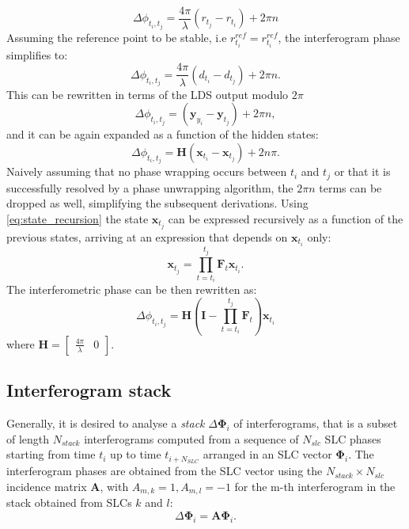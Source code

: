 \documentclass{article}
\begin{document}
\begin{equation}
	\Delta\phi_{t_i,t_j} =  \frac{4\pi}{\lambda} \left(r_{t_j} - r_{t_i}\right) + 2 \pi n
\end{equation}
Assuming the reference point to be stable, i.e $r_{t_i}^{ref} = r_{t_i}^{ref}$, the interferogram phase simplifies to:
\begin{equation}
	\Delta\phi_{t_i,t_j} =  \frac{4\pi}{\lambda} \left(d_{t_i} - d_{t_j}\right) + 2 \pi n.
\end{equation}
This can be rewritten in terms of the LDS output modulo $2\pi$ 
\begin{equation}
	\Delta\phi_{t_i,t_j} = \left(\mathbf{y}_{y_i} - \mathbf{y}_{t_j}\right) + 2 \pi n,
\end{equation}
and it can be again expanded as a function of the hidden states:
\begin{equation}\label{ifgram_phase}
	\Delta\phi_{t_i,t_j} = \mathbf{H} \left( \mathbf{x}_{t_i} - \mathbf{x}_{t_j} \right) +2 n \pi.
\end{equation}		
Naively assuming that no phase wrapping occurs between $t_{i}$ and $t_{j}$ or that it is successfully resolved by a phase unwrapping algorithm, the $2\pi n$ terms can be dropped as well, simplifying the subsequent derivations.
Using \autoref{eq:state_recursion} the state $\mathbf{x}_{t_j}$ can be expressed recursively as a function of the previous states, arriving at an expression that depends on $\mathbf{x}_{t_i}$ only:
\begin{equation}
	\mathbf{x}_{t_j} = \prod_{t=t_{i}}^{t_j}\mathbf{F}_t \mathbf{x}_{t_i}.
\end{equation}
The interferometric phase can be then rewritten as:
\begin{equation}
	\Delta\phi_{t_i,t_j} = \mathbf{H} \left(\mathbf{I} - \prod_{t=t_{i}}^{t_j}\mathbf{F}_t \right)\mathbf{x}_{t_i}
\end{equation}	
where $\mathbf{H} = 
	\begin{bmatrix}
	 \frac{4\pi}{\lambda} & 0
	\end{bmatrix}$.
\subsection{Interferogram stack}
Generally, it is desired to analyse a \emph{stack} $\Delta\mathbf{\Phi}_{i}$  of interferograms, that is a subset of length $N_{stack}$ interferograms computed from a sequence of $N_{slc}$ SLC phases starting from time $t_i$ up to time $t_{i+N_{SLC}}$ arranged in an SLC vector $\mathbf{\Phi}_i$. The interferogram phases  are obtained from the SLC vector using the  $N_{stack}\times N_{slc}$ incidence matrix $\mathbf{A}$, with $A_{m,k} = 1, A_{m,l}=-1$ for the m-th interferogram in the stack obtained from SLCs $k$ and $l$\cite{Agram2015}:
\begin{equation}
	 \Delta\mathbf{\Phi}_{i} = \mathbf{A} \mathbf{\Phi}_{i}.
\end{equation}
\end{document}

